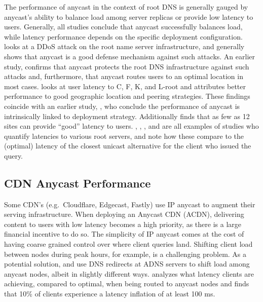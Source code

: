 \documentclass[sigconf,nonacm,10pt]{acmart}
\begin{document}
The performance of anycast in the context of root DNS is generally
gauged by anycast's ability to balance load among server replicas or
provide low latency to users. Generally, all studies conclude that
anycast successfully balances load, while latency performance depends on
the specific deployment configuration. \cite{moura2016anycast} looks at
a DDoS attack on the root name server infrastructure, and generally
shows that anycast is a good defense mechanism against such attacks. An
earlier study, \cite{sarat2006use} confirms that anycast protects the
root DNS infrastructure against such attacks and, furthermore, that
anycast routes users to an optimal location in most cases.
\cite{de2017anycast} looks at user latency to C, F, K, and L-root and
attributes better performance to good geographic location and peering
strategies. These findings coincide with an earlier study,
\cite{ballani2006measurement}, who conclude the performance of anycast
is intrinsically linked to deployment strategy. Additionally
\cite{de2017anycast} finds that as few as 12 sites can provide ``good''
latency to users. \cite{li_leven_spring_bhattacharjee_2018},
\cite{colitti2006evaluating}, \cite{de2017anycast}, and
\cite{liang2013measuring} are all examples of studies who quantify
latencies to various root servers, and note how these compare to the
(optimal) latency of the closest unicast alternative for the client who
issued the query.

\subsection{CDN Anycast Performance}\label{cdn-anycast-performance}

Some CDN's (e.g.~Cloudflare, Edgecast, Fastly) use IP anycast to augment
their serving infrastructure. When deploying an Anycast CDN (ACDN),
delivering content to users with low latency becomes a high priority, as
there is a large financial incentive to do so. The simplicity of IP
anycast comes at the cost of having coarse grained control over where
client queries land. Shifting client load between nodes during peak
hours, for example, is a challenging problem. As a potential solution,
\cite{flavel2015fastroute} and \cite{alzoubi2011practical} use DNS
redirects at ADNS servers to shift load among anycast nodes, albeit in
slightly different ways. \cite{calder2015analyzing} analyzes what
latency clients are achieving, compared to optimal, when being routed to
anycast nodes and finds that 10\% of clients experience a latency
inflation of at least 100 ms.
\end{document}
